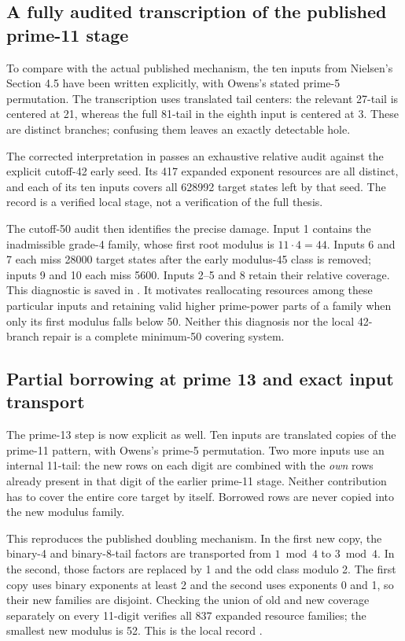 \documentclass[11pt]{article}
\begin{document}
\subsection{A fully audited transcription of the published prime-11 stage}
To compare with the actual published mechanism, the ten inputs from
Nielsen's Section 4.5 have been written explicitly, with Owens's stated
prime-5 permutation. The transcription uses translated tail centers:
the relevant 27-tail is centered at 21, whereas the full 81-tail in the
eighth input is centered at 3. These are distinct branches; confusing them
leaves an exactly detectable hole.

The corrected interpretation in  passes an
exhaustive relative audit against the explicit cutoff-42 early seed.
Its 417 expanded exponent resources are all distinct, and each of its ten
inputs covers all 628992 target states left by that seed. The record
 is a verified local stage,
not a verification of the full thesis.

The cutoff-50 audit then identifies the precise damage. Input 1 contains
the inadmissible grade-4 family, whose first root modulus is $11\cdot4=44$.
Inputs 6 and 7 each miss 28000 target states after the early modulus-45
class is removed; inputs 9 and 10 each miss 5600. Inputs 2--5 and 8 retain
their relative coverage. This diagnostic is saved in
.
It motivates reallocating resources among these particular inputs and
retaining valid higher prime-power parts of a family when only its first
modulus falls below 50. Neither this diagnosis nor the local 42-branch
repair is a complete minimum-50 covering system.

\subsection{Partial borrowing at prime 13 and exact input transport}
The prime-13 step is now explicit as well. Ten inputs are translated copies
of the prime-11 pattern, with Owens's prime-5 permutation. Two more inputs
use an internal 11-tail: the new rows on each digit are combined with the
\emph{own} rows already present in that digit of the earlier prime-11 stage.
Neither contribution has to cover the entire core target by itself.
Borrowed rows are never copied into the new modulus family.

This reproduces the published doubling mechanism. In the first new copy,
the binary-4 and binary-8-tail factors are transported from $1\bmod4$ to
$3\bmod4$. In the second, those factors are replaced by 1 and the odd
class modulo 2. The first copy uses binary exponents at least 2 and the
second uses exponents 0 and 1, so their new families are disjoint.
Checking the union of old and new coverage separately on every 11-digit
verifies all 837 expanded resource families; the smallest new modulus is
52. This is the local record .
\end{document}
